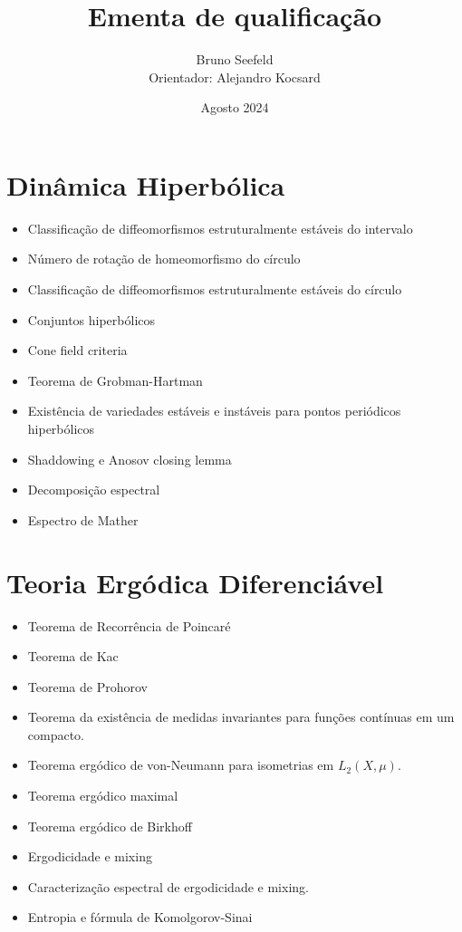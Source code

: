 \documentclass{article}
\title{Ementa de qualificação}
\author{Bruno Seefeld\\
Orientador: Alejandro Kocsard}
\date{Agosto 2024}
\begin{document}
\maketitle


\section{Dinâmica Hiperbólica}

\begin{itemize}
    \item Classificação de diffeomorfismos estruturalmente estáveis do intervalo
    \item Número de rotação de homeomorfismo do círculo
    \item Classificação de diffeomorfismos estruturalmente estáveis do círculo
    \item Conjuntos hiperbólicos
    \item Cone field criteria
    \item Teorema de Grobman-Hartman
    \item Existência de variedades estáveis e instáveis para pontos periódicos hiperbólicos
    \item Shaddowing e Anosov closing lemma
    \item Decomposição espectral
    \item Espectro de Mather




\end{itemize}


\section{Teoria Ergódica Diferenciável}
\begin{itemize}
    \item Teorema de Recorrência de Poincaré
    \item Teorema de Kac 
    \item Teorema de Prohorov
    \item Teorema da existência de medidas invariantes para funções contínuas em um compacto.
    \item Teorema ergódico de von-Neumann para isometrias em $L_2(X,\mu)$.
    \item Teorema ergódico maximal
    \item Teorema ergódico de Birkhoff
    \item Ergodicidade e mixing
    \item Caracterização espectral de ergodicidade e mixing.
    \item Entropia e fórmula de Komolgorov-Sinai
\end{itemize}
\end{document}
